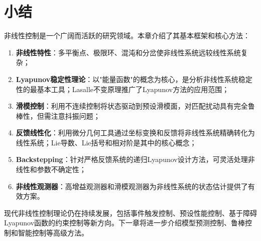 \section{小结}

非线性控制是一个广阔而活跃的研究领域。本章介绍了其基本框架和核心方法：

\begin{enumerate}
\item \textbf{非线性特性}：多平衡点、极限环、混沌和分岔使非线性系统远较线性系统复杂；
\item \textbf{Lyapunov稳定性理论}：以"能量函数"的概念为核心，是分析非线性系统稳定性的最基本工具；Lasalle不变原理推广了Lyapunov方法的应用范围；
\item \textbf{滑模控制}：利用不连续控制将状态驱动到预设滑模面，对匹配扰动具有完全鲁棒性，但需注意抖振问题；
\item \textbf{反馈线性化}：利用微分几何工具通过坐标变换和反馈将非线性系统精确转化为线性系统；Lie导数、Lie括号和相对阶是其中的核心概念；
\item \textbf{Backstepping}：针对严格反馈系统的递归Lyapunov设计方法，可灵活处理非线性和参数不确定性；
\item \textbf{非线性观测器}：高增益观测器和滑模观测器为非线性系统的状态估计提供了有效方案。
\end{enumerate}

现代非线性控制理论仍在持续发展，包括事件触发控制、预设性能控制、基于障碍Lyapunov函数的约束控制等新方向。下一章将进一步介绍模型预测控制、鲁棒控制和智能控制等高级方法。
